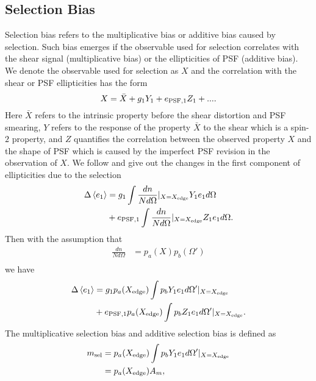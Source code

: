 \subsection{Selection Bias}
\label{sec_Method_select}
Selection bias refers to the multiplicative bias or additive bias caused by
selection. Such bias emerges if the observable used for selection correlates
with the shear signal (multiplicative bias) or the ellipticities of PSF
(additive bias).
We denote the observable used for selection as $X$ and the correlation with the
shear or PSF ellipticities has the form
\begin{equation}
X=\bar{X}+g_1Y_1+e_{\rm{PSF,1}}Z_1+....
\end{equation}
Here $\bar{X}$ refers to the intrinsic property before the shear distortion and
PSF smearing, $Y$ refers to the response of the property $\bar{X}$ to the shear
which is a spin-$2$ property, and $Z$ quantifies the correlation between the
observed property $X$ and the shape of PSF which is caused by the imperfect PSF
revision in the observation of $X$. We follow \citet{HSC1-GREAT3Sim} and give
out the changes in the first component of ellipticities due to the selection
\begin{equation}
\begin{split}
\Delta \left\langle e_1\right \rangle  &= g_1\int \frac{dn}{Nd\Omega } |_{X=X_{\rm{edge}}} Y_1 e_1 d\Omega \\
        &+ e_{\rm{PSF,1}} \int \frac{dn}{Nd\Omega}|_{X=X_{\rm{edge}}} Z_1 e_1 d\Omega.
\end{split}
\end{equation}
Then with the assumption that
\begin{equation}
\begin{split}
 \frac{dn}{Nd\Omega}&=p_a(X)p_b(\Omega')\\
\end{split}
\end{equation}
we have
\begin{equation}
\begin{split}
\Delta \left\langle e_1\right \rangle  &= g_1p_a(X_{\rm{edge}})\int p_b Y_1 e_1
d\Omega'|_{X=X_{\rm{edge}}} \\ &+ e_{\rm{PSF,1}} p_a(X_{\rm{edge}}) \int p_b
Z_1 e_1 d\Omega'|_{X=X_{\rm{edge}}} .
\end{split}
\end{equation}
The multiplicative selection bias and additive selection bias is defined as
\begin{equation}
\begin{split}
m_{\rm{sel}}&=p_a(X_{\rm{edge}})\int p_b Y_1 e_1 d\Omega'|_{X=X_{\rm{edge}}} \\
            &=p_a(X_{\rm{edge}}) A_m,\\
\end{split}
\end{equation}

